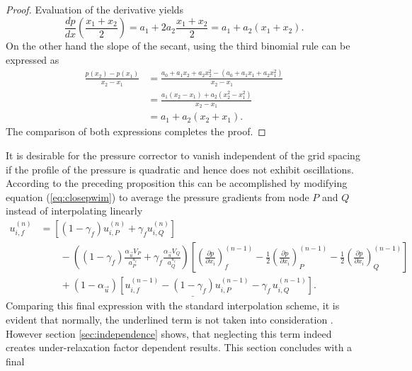 \begin{proof}
Evaluation of the derivative yields
\begin{displaymath}
    \frac{dp}{dx}\left(\frac{x_1+x_2}{2}\right) = a_1 + 2 a_2 \frac{x_1 + x_2}{2} = a_1 + a_2(x_1 + x_2).
\end{displaymath}
On the other hand the slope of the secant, using the third binomial rule can be expressed as
\begin{displaymath}
  \begin{array}{ll}
  \frac{p(x_2) - p(x_1)}{x_2 - x_1} 
&= \frac{a_0 + a_1 x_2 + a_2 x_2^2 - \left(a_0 + a_1 x_1 + a_2 x_1 ^2\right)}{x_2 - x_1} \\[1.0em]
  \quad &= \frac{a_1 (x_2 - x_1) + a_2 \left(x_2^2 - x_1^2\right)}{x_2 - x_1} \\[1.0em]
  \quad &= a_1 + a_2 (x_2 + x_1).
\end{array}
\end{displaymath}
The comparison of both expressions completes the proof.
\end{proof}
  It is desirable for the pressure corrector to vanish independent of the grid spacing if the profile of the pressure is quadratic and hence does not exhibit oscillations. According to the preceding proposition this can be accomplished by modifying equation (\ref{eq:closepwim}) to average the pressure gradients from node \(P\) and \(Q\) instead of interpolating linearly
\begin{align}
  u_{i,f}^{(n)} 
  &=
  \left[\left(1 - \gamma_f\right) u_{i,P}^{(n)} + \gamma_f u_{i,Q}^{(n)} \right] \nonumber\\[1em]
  &\quad\quad - 
  \left(\left(1 - \gamma_f\right) \frac{\alpha_\vec{u} V_P}{a_P^{u_i}} + \gamma_f \frac{\alpha_\vec{u} V_Q}{a_Q^{u_i}}\right)
  \left[ 
  \left(\frac{\partial p}{\partial x_i}\right)_f^{(n-1)} 
  - \frac{1}{2} \left( \frac{\partial p}{\partial x_i} \right)_P^{(n-1)} 
  - \frac{1}{2} \left(\frac{\partial p}{\partial x_i}\right)_Q^{(n-1)}
  \right] \nonumber \\[1em]
  \label{eq:pwim}
  &\quad\quad + \underline{\left(1 - \alpha_\vec{u}\right) \left[ u_{i,f}^{(n-1)} - \left(1 - \gamma_f\right) u_{i,P}^{(n-1)} - \gamma_f \, u_{i,Q}^{(n-1)} \right]}.
\end{align}
Comparing this final expression with the standard interpolation scheme, it is evident that normally, the underlined term is not taken into consideration \cite{ferziger02}. However section \ref{sec:independence} shows, that neglecting this term indeed creates under-relaxation factor dependent results. This section concludes with a final
